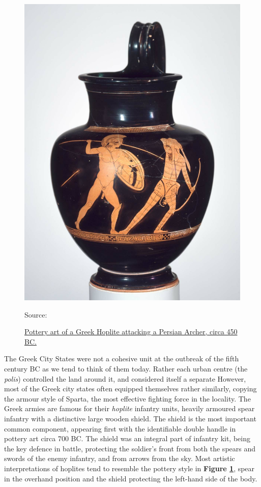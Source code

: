 \documentclass[twoside, a4paper, 12pt]{article}
\newcommand{\sourceR}[1]{\caption*{\hfill Source: {#1}} }
\begin{document}
\begin{figure}
  \centering
  \includegraphics[width=\linewidth]{HopliteArcher.jpg}
  \captionsetup{justification=raggedleft}
  \caption{\ul{ Pottery art of a Greek Hoplite attacking a Persian Archer, circa 450 BC.}}
  \sourceR{\cite{MFABoston_2017_hoplite}}
  \label{img:HopliteArcher}
\end{figure}

The Greek City States were not a cohesive unit at the outbreak of the fifth century
BC as we tend to think of them today. Rather each urban centre (the
\emph{polis}) controlled
the land around it, and considered itself a separate 
However, most of the Greek city states often equipped
themselves rather similarly, copying the armour style of Sparta, the most
effective fighting force in the locality.
The Greek armies are famous for their \emph{hoplite} infantry units, heavily
armoured spear infantry with a distinctive large wooden shield. The shield is
the most important common component, appearing first with the
identifiable double handle in pottery art
circa 700 BC.\footnotemark
The shield was an integral part of infantry kit, being the key defence in battle,
protecting the soldier's front from both the spears and swords of the enemy
infantry, and from arrows from the sky.
Most artistic interpretations of hoplites tend to resemble the pottery
style in \textbf{Figure \ref{img:HopliteArcher}}, spear in the overhand
position and the shield protecting the left-hand side of the body.
\end{document}
